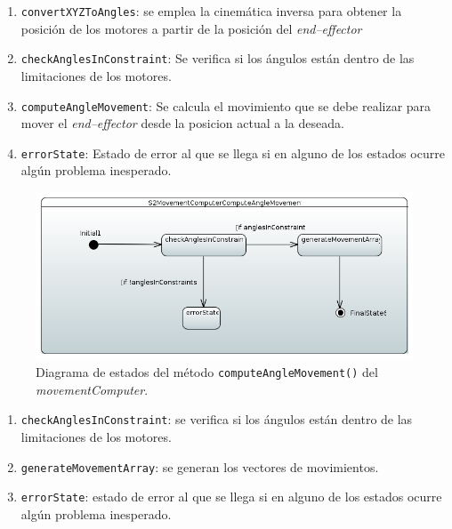 \begin{enumerate}
    \item \texttt{convertXYZToAngles}: se emplea la cinemática inversa para obtener la posición de los motores a partir de la posición del \textit{end--effector}
    \item \texttt{checkAnglesInConstraint}: Se verifica si los ángulos están dentro de las limitaciones de los motores.
    \item \texttt{computeAngleMovement}: Se calcula el movimiento que se debe realizar para mover el \textit{end--effector} desde la posicion actual a la deseada.
    \item \texttt{errorState}: Estado de error al que se llega si en alguno de los estados ocurre algún problema inesperado. 
\end{enumerate}

\begin{figure}[H]
    \centering
    \includegraphics[width=1\linewidth]{pictures/S2MovementComputerComputeAngleMovement.PNG}
    \caption{Diagrama de estados del método \texttt{computeAngleMovement()} del \textit{movementComputer}.}
    \label{fig:fun_compute_angle_mocement_movement_computer}
\end{figure}

\begin{enumerate}
    \item \texttt{checkAnglesInConstraint}: se verifica si los ángulos están dentro de las limitaciones de los motores.
    \item \texttt{generateMovementArray}: se generan los vectores de movimientos.
    \item \texttt{errorState}: estado de error al que se llega si en alguno de los estados ocurre algún problema inesperado. 
\end{enumerate}